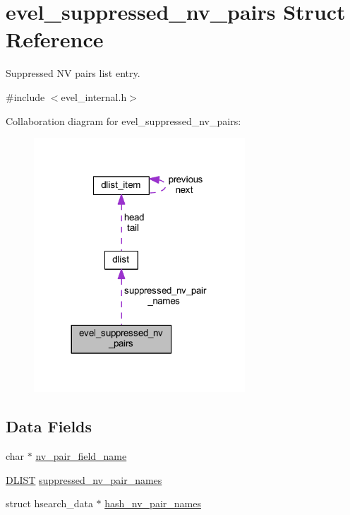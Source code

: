 \hypertarget{structevel__suppressed__nv__pairs}{}\section{evel\+\_\+suppressed\+\_\+nv\+\_\+pairs Struct Reference}
\label{structevel__suppressed__nv__pairs}


Suppressed NV pairs list entry.  




{\ttfamily \#include $<$evel\+\_\+internal.\+h$>$}



Collaboration diagram for evel\+\_\+suppressed\+\_\+nv\+\_\+pairs\+:
\nopagebreak
\begin{figure}[H]
\begin{center}
\leavevmode
\includegraphics[width=224pt]{structevel__suppressed__nv__pairs__coll__graph}
\end{center}
\end{figure}
\subsection*{Data Fields}
\begin{DoxyCompactItemize}
\item 
char $\ast$ \hyperlink{structevel__suppressed__nv__pairs_a573e5fe33375ecce2b876375d0522b60}{nv\+\_\+pair\+\_\+field\+\_\+name}
\item 
\hyperlink{double__list_8h_a45f4a129042d9e1aa4ffd31fe13e4d14}{D\+L\+I\+ST} \hyperlink{structevel__suppressed__nv__pairs_a7378a0a95b371e0edc13a4ab9ce8a26e}{suppressed\+\_\+nv\+\_\+pair\+\_\+names}
\item 
struct hsearch\+\_\+data $\ast$ \hyperlink{structevel__suppressed__nv__pairs_ad62100efab258703433968a2effb1221}{hash\+\_\+nv\+\_\+pair\+\_\+names}
\end{DoxyCompactItemize}


